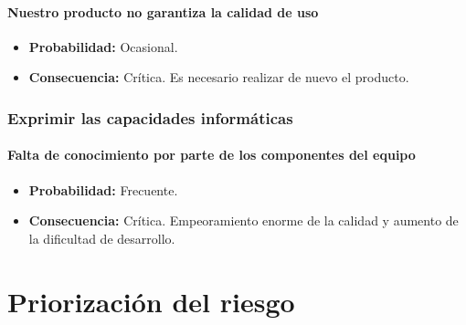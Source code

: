\documentclass[spanish,a4paper,12pt]{report}	%
\begin{document}
\subsection*{Nuestro producto no garantiza la calidad de uso}	
	\begin{itemize}
		\item \textbf {Probabilidad: }Ocasional.
		\item \textbf {Consecuencia: }Crítica. Es necesario realizar de nuevo el producto.
	\end{itemize}

%
\section{Exprimir las capacidades informáticas}

\subsection*{Falta de conocimiento por parte de los componentes del equipo}	
	\begin{itemize}
		\item \textbf {Probabilidad: }Frecuente.
		\item \textbf {Consecuencia: }Crítica. Empeoramiento enorme de la calidad y aumento de la dificultad de desarrollo.
	\end{itemize}




\newpage
\mbox{}
\thispagestyle{empty}						%
\newpage

\part{Priorización del riesgo}

%
\setcounter{section}{0}
\end{document}
